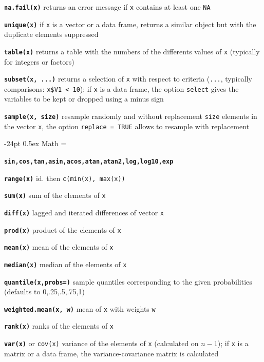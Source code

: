 \documentclass[8pt,landscape]{article}
\makeatletter
\renewcommand\section{\@startsection{section}{1}{0mm}%
                                     {-24pt}%
                                     {0.5ex}%
                                {\color{blue}\normalfont\large\bfseries}}
\newcommand{\code}{\texttt}
\newcommand{\bcode}[1]{\texttt{\textbf{#1}}}
\makeatother
\begin{document}
\begin{multicols*}{3}
\bcode{na.fail(x)}  returns an error message if \code{x} contains at least one \code{NA}

\bcode{unique(x)}  if \code{x} is a vector or a data frame, returns a similar object but with the duplicate elements suppressed

\bcode{table(x)}  returns a table with the numbers of the differents values of \code{x} (typically for integers or factors)

\bcode{subset(x, ...)}  returns a selection of \code{x} with respect to criteria (\code{...}, typically comparisons: \code{x\$V1 < 10}); if \code{x} is a data frame, the option \code{select} gives the variables to be kept or dropped using a minus sign

\bcode{sample(x, size)}  resample randomly and without replacement \code{size} elements in the vector \code{x}, the option \code{replace = TRUE} allows to resample with replacement



\bigskip

\section{Math}
\everypar={\hangindent=9mm}

\bcode{sin,cos,tan,asin,acos,atan,atan2,log,log10,exp}

\bcode{range(x)}  id. then \code{c(min(x), max(x))}

\bcode{sum(x)}  sum of the elements of \code{x}

\bcode{diff(x)}  lagged and iterated differences of vector \code{x}

\bcode{prod(x)}  product of the elements of \code{x}

\bcode{mean(x)}  mean of the elements of \code{x}

\bcode{median(x)}  median of the elements of \code{x}

\bcode{quantile(x,probs=)} sample quantiles
     corresponding to the given probabilities (defaults to 0,.25,.5,.75,1)

\bcode{weighted.mean(x, w)} mean of \code{x} with weights \code{w}

\bcode{rank(x)}  ranks of the elements of \code{x}

\bcode{var(x)} or \code{cov(x)}  variance of the elements of \code{x}
(calculated on $n-1$); if \code{x} is a matrix or a data frame, the
variance-covariance matrix is calculated


\end{multicols*}
\end{document}
